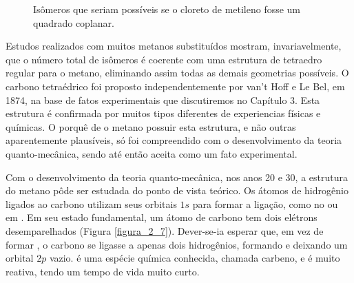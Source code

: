 \begin{figure}[H]
    \centering
    \caption{Isômeros que seriam possíveis se o cloreto de metileno fosse um quadrado coplanar.}
    \label{figura_2_6}
\end{figure}

Estudos realizados com muitos metanos substituídos mostram, invariavelmente, que o número total de isômeros é coerente com uma estrutura de tetraedro regular para o metano, eliminando assim todas as demais geometrias possíveis. O carbono tetraédrico foi proposto independentemente por van't Hoff e Le Bel, em 1874, na base de fatos experimentais que discutiremos no Capítulo 3. Esta estrutura é confirmada por muitos tipos diferentes de experiencias físicas e químicas. O porquê de o metano possuir esta estrutura, e não outras aparentemente plausíveis, só foi compreendido com o desenvolvimento da teoria quanto-mecânica, sendo até então aceita como um fato experimental.

Com o desenvolvimento da teoria quanto-mecânica, nos anos 20 e 30, a estrutura do metano pôde ser estudada do ponto de vista teórico. Os átomos de hidrogênio ligados ao carbono utilizam seus orbitais $1s$ para formar a ligação, como no  ou em . Em seu estado fundamental, um átomo de carbono tem dois elétrons desemparelhados (Figura \ref{figura_2_7}). Dever-se-ia esperar que, em vez de formar , o carbono se ligasse a apenas dois hidrogênios, formando  e deixando um orbital $2p$ vazio.  é uma espécie química conhecida, chamada carbeno, e é muito reativa, tendo um tempo de vida muito curto. 

